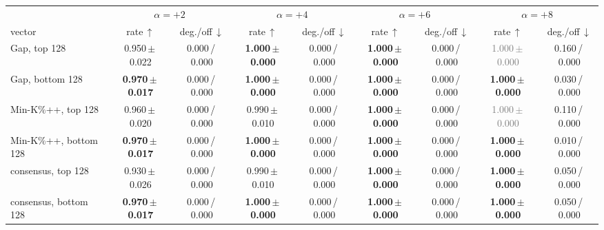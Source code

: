 \begin{tabular}{@{}lcccccccc@{}}
\toprule
& \multicolumn{2}{c}{$\alpha=+2$} & \multicolumn{2}{c}{$\alpha=+4$} & \multicolumn{2}{c}{$\alpha=+6$} & \multicolumn{2}{c}{$\alpha=+8$} \\
\cmidrule(lr){2-3}\cmidrule(lr){4-5}\cmidrule(lr){6-7}\cmidrule(lr){8-9}
vector & rate\,$\uparrow$ & deg./off\,$\downarrow$ & rate\,$\uparrow$ & deg./off\,$\downarrow$ & rate\,$\uparrow$ & deg./off\,$\downarrow$ & rate\,$\uparrow$ & deg./off\,$\downarrow$ \\
\midrule
Gap, top 128 & 0.950\,{\scriptsize$\pm$\,0.022} & {\scriptsize 0.000\,/\,0.000} & \textbf{1.000\,{\scriptsize$\pm$\,0.000}} & {\scriptsize 0.000\,/\,0.000} & \textbf{1.000\,{\scriptsize$\pm$\,0.000}} & {\scriptsize 0.000\,/\,0.000} & \textcolor{gray}{1.000\,{\scriptsize$\pm$\,0.000}} & {\scriptsize 0.160\,/\,0.000} \\
Gap, bottom 128 & \textbf{0.970\,{\scriptsize$\pm$\,0.017}} & {\scriptsize 0.000\,/\,0.000} & \textbf{1.000\,{\scriptsize$\pm$\,0.000}} & {\scriptsize 0.000\,/\,0.000} & \textbf{1.000\,{\scriptsize$\pm$\,0.000}} & {\scriptsize 0.000\,/\,0.000} & \textbf{1.000\,{\scriptsize$\pm$\,0.000}} & {\scriptsize 0.030\,/\,0.000} \\
Min-K\%++, top 128 & 0.960\,{\scriptsize$\pm$\,0.020} & {\scriptsize 0.000\,/\,0.000} & 0.990\,{\scriptsize$\pm$\,0.010} & {\scriptsize 0.000\,/\,0.000} & \textbf{1.000\,{\scriptsize$\pm$\,0.000}} & {\scriptsize 0.000\,/\,0.000} & \textcolor{gray}{1.000\,{\scriptsize$\pm$\,0.000}} & {\scriptsize 0.110\,/\,0.000} \\
Min-K\%++, bottom 128 & \textbf{0.970\,{\scriptsize$\pm$\,0.017}} & {\scriptsize 0.000\,/\,0.000} & \textbf{1.000\,{\scriptsize$\pm$\,0.000}} & {\scriptsize 0.000\,/\,0.000} & \textbf{1.000\,{\scriptsize$\pm$\,0.000}} & {\scriptsize 0.000\,/\,0.000} & \textbf{1.000\,{\scriptsize$\pm$\,0.000}} & {\scriptsize 0.010\,/\,0.000} \\
consensus, top 128 & 0.930\,{\scriptsize$\pm$\,0.026} & {\scriptsize 0.000\,/\,0.000} & 0.990\,{\scriptsize$\pm$\,0.010} & {\scriptsize 0.000\,/\,0.000} & \textbf{1.000\,{\scriptsize$\pm$\,0.000}} & {\scriptsize 0.000\,/\,0.000} & \textbf{1.000\,{\scriptsize$\pm$\,0.000}} & {\scriptsize 0.050\,/\,0.000} \\
consensus, bottom 128 & \textbf{0.970\,{\scriptsize$\pm$\,0.017}} & {\scriptsize 0.000\,/\,0.000} & \textbf{1.000\,{\scriptsize$\pm$\,0.000}} & {\scriptsize 0.000\,/\,0.000} & \textbf{1.000\,{\scriptsize$\pm$\,0.000}} & {\scriptsize 0.000\,/\,0.000} & \textbf{1.000\,{\scriptsize$\pm$\,0.000}} & {\scriptsize 0.050\,/\,0.000} \\

\end{tabular}
